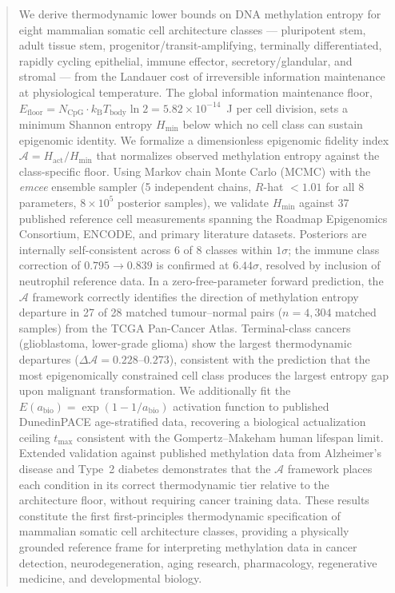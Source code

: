 \documentclass[12pt,a4paper]{article}
\newcommand{\Hmin}{H_{\min}}
\newcommand{\Hact}{H_{\mathrm{act}}}
\newcommand{\Ascore}{\mathcal{A}}
\newcommand{\Efloor}{E_{\mathrm{floor}}}
\newcommand{\Tbody}{T_{\mathrm{body}}}
\newcommand{\kB}{k_{\mathrm{B}}}
\newcommand{\NcpG}{N_{\mathrm{CpG}}}
\begin{document}
\begin{abstract}
\noindent
We derive thermodynamic lower bounds on DNA methylation entropy for eight
mammalian somatic cell architecture classes --- pluripotent stem, adult tissue stem,
progenitor/transit-amplifying, terminally differentiated, rapidly cycling epithelial,
immune effector, secretory/glandular, and stromal --- from the Landauer cost of
irreversible information maintenance at physiological temperature. The global
information maintenance floor, $\Efloor = \NcpG \cdot \kB \Tbody \ln 2 = 5.82 \times
10^{-14}$~J per cell division, sets a minimum Shannon entropy $\Hmin$ below which
no cell class can sustain epigenomic identity. We formalize a dimensionless epigenomic
fidelity index $\Ascore = \Hact / \Hmin$ that normalizes observed methylation entropy
against the class-specific floor. Using Markov chain Monte Carlo (MCMC) with the
\textit{emcee} ensemble sampler (5 independent chains, $R$-hat $< 1.01$ for all
8 parameters, $8 \times 10^5$ posterior samples), we validate $\Hmin$ against 37
published reference cell measurements spanning the Roadmap Epigenomics Consortium,
ENCODE, and primary literature datasets. Posteriors are internally self-consistent
across 6 of 8 classes within $1\sigma$; the immune class correction of $0.795
\rightarrow 0.839$ is confirmed at $6.44\sigma$, resolved by inclusion of
neutrophil reference data. In a zero-free-parameter forward prediction, the
$\Ascore$ framework correctly identifies the direction of methylation entropy
departure in 27 of 28 matched tumour--normal pairs ($n = 4{,}304$ matched samples)
from the TCGA Pan-Cancer Atlas. Terminal-class cancers (glioblastoma, lower-grade
glioma) show the largest thermodynamic departures ($\Delta\Ascore = 0.228$--$0.273$),
consistent with the prediction that the most epigenomically constrained cell class
produces the largest entropy gap upon malignant transformation. We additionally
fit the $E(a_{\mathrm{bio}}) = \exp(1 - 1/a_{\mathrm{bio}})$ activation function to
published DunedinPACE age-stratified data, recovering a biological actualization
ceiling $t_{\max}$ consistent with the Gompertz--Makeham human lifespan limit.
Extended validation against published methylation data from Alzheimer's disease
and Type~2 diabetes demonstrates that the $\Ascore$ framework places each condition
in its correct thermodynamic tier relative to the architecture floor, without
requiring cancer training data.
These results constitute the first first-principles thermodynamic specification of
mammalian somatic cell architecture classes, providing a physically grounded reference
frame for interpreting methylation data in cancer detection, neurodegeneration,
aging research, pharmacology, regenerative medicine, and developmental biology.
\end{abstract}
\end{document}
